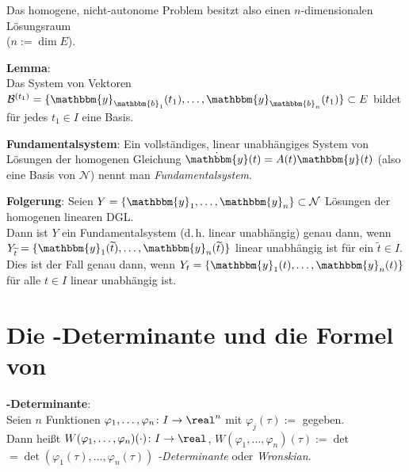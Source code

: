 Das homogene, nicht-autonome Problem besitzt also einen $n$-dimensionalen
Lösungsraum \\
($n := \dim E$).

\textbf{Lemma}: \\
Das System von Vektoren
$\mathcal{B}^{(t_1)} = \{\mathbbm{y}_{\mathbbm{b}_1}(t_1), \dotsc,
\mathbbm{y}_{\mathbbm{b}_n}(t_1)\} \subset E$ bildet für jedes $t_1 \in I$
eine Basis.

\textbf{Fundamentalsystem}:
Ein vollständiges, linear unabhängiges System von Lösungen der homogenen
Gleichung $\dot{\mathbbm{y}}(t) = A(t) \mathbbm{y}(t)$
(also eine Basis von $\mathcal{N}$) nennt man \emph{Fundamentalsystem}.

\textbf{Folgerung}:
Seien $Y = \{\mathbbm{y}_1, \dotsc, \mathbbm{y}_n\} \subset \mathcal{N}$
Lösungen der homogenen linearen DGL. \\
Dann ist $Y$ ein Fundamentalsystem (d.\,h. linear unabhängig)
genau dann, wenn \\
$Y_{\widetilde{t}} = \{\mathbbm{y}_1(\widetilde{t}), \dotsc,
\mathbbm{y}_n(\widetilde{t})\}$
linear unabhängig ist für ein $\widetilde{t} \in I$.
Dies ist der Fall genau dann, wenn
$Y_t = \{\mathbbm{y}_1(t), \dotsc, \mathbbm{y}_n(t)\}$
für alle $t \in I$ linear unabhängig ist.

\section{%
    Die -Determinante und die Formel von %
}

\textbf{-Determinante}: \\
Seien $n$ Funktionen
$\varphi_1, \dotsc, \varphi_n\colon I \rightarrow \real^n$ mit
$\varphi_j(\tau) :=$
gegeben. \\
Dann heißt
$W(\varphi_1, \dotsc, \varphi_n)(\cdot)\colon I \rightarrow \real$,
$W(\varphi_1, \dotsc, \varphi_n)(\tau) := \det$
 \\
$ = \det(\varphi_1(\tau), \dotsc, \varphi_n(\tau))$
\emph{-Determinante} oder \emph{Wronskian}.

